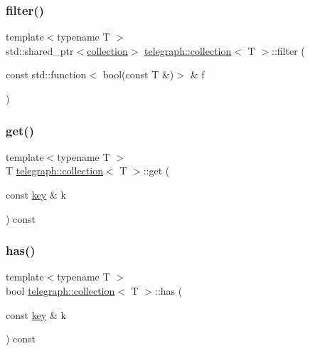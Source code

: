 \mbox{\label{classtelegraph_1_1collection_afa7564c9896fde9d965f422f8ee6a4ce}} 
\subsubsection{\texorpdfstring{filter()}{filter()}}
{\footnotesize\ttfamily template$<$typename T $>$ \\
std\+::shared\+\_\+ptr$<$\hyperlink{classtelegraph_1_1collection}{collection}$>$ \hyperlink{classtelegraph_1_1collection}{telegraph\+::collection}$<$ T $>$\+::filter (\begin{DoxyParamCaption}\item[{const std\+::function$<$ bool(const T \&)$>$ \&}]{f }\end{DoxyParamCaption})\hspace{0.3cm}{\ttfamily [inline]}}

\mbox{\label{classtelegraph_1_1collection_a3065b252176bd28f4280ad0384276e3e}} 
\subsubsection{\texorpdfstring{get()}{get()}}
{\footnotesize\ttfamily template$<$typename T $>$ \\
T \hyperlink{classtelegraph_1_1collection}{telegraph\+::collection}$<$ T $>$\+::get (\begin{DoxyParamCaption}\item[{const \hyperlink{classtelegraph_1_1collection_a7d1c05b1bdcbe95a3127122969e14173}{key} \&}]{k }\end{DoxyParamCaption}) const\hspace{0.3cm}{\ttfamily [inline]}}

\mbox{\label{classtelegraph_1_1collection_af9b482ee7d179bd7c4dfa47fba1df507}} 
\subsubsection{\texorpdfstring{has()}{has()}}
{\footnotesize\ttfamily template$<$typename T $>$ \\
bool \hyperlink{classtelegraph_1_1collection}{telegraph\+::collection}$<$ T $>$\+::has (\begin{DoxyParamCaption}\item[{const \hyperlink{classtelegraph_1_1collection_a7d1c05b1bdcbe95a3127122969e14173}{key} \&}]{k }\end{DoxyParamCaption}) const\hspace{0.3cm}{\ttfamily [inline]}}

